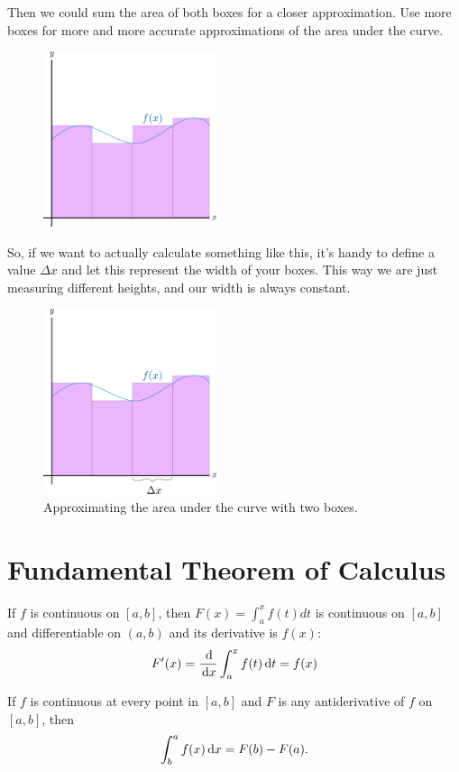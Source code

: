 Then we could sum the area of both boxes for a closer approximation.
Use more boxes for more and more accurate approximations of the area under the curve.
\begin{figure}[H]
  \begin{center}
    \includegraphics[width=2in]{continuous/integration/rei4}
  \end{center}
\end{figure}
So, if we want to actually calculate something like this, it's handy to define a value $\Delta x$
and let this represent the width of your boxes.
This way we are just measuring different heights, and our width is always constant.
\begin{figure}[H]
  \begin{center}
    \includegraphics[width=2in]{continuous/integration/rei5}
  \end{center}
  \caption{Approximating the area under the curve with two boxes.}
\end{figure}

\section{Fundamental Theorem of Calculus}
\begin{theorem}
  If $f$ is continuous on $[a,b]$, then $F(x)=\int^x_a f(t)dt$ is continuous on $[a,b]$ and
  differentiable on $(a,b)$ and its derivative is $f(x)$:
  \begin{equation}
    F'(x) = \frac{\,\mathrm{d}}{\,\mathrm{d} x} \int^x_a f(t)\,\mathrm{d} t=f(x)
    \label{eq:ftc1}
  \end{equation}
  \cite[p. 276]{thomas}
  \label{th:ftc1}
\end{theorem}
\begin{theorem}
  If $f$ is continuous at every point in $[a,b]$ and $F$ is any antiderivative of $f$ on $[a,b]$, then
  \begin{equation}
    \int^a_b f(x)\,\mathrm{d} x=F(b)-F(a).
    \label{eq:ftc2}
  \end{equation}
  \cite[p. 277]{thomas}
  \label{th:ftc2}
\end{theorem}

